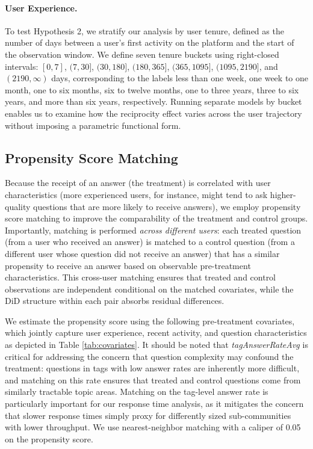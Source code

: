 \paragraph{User Experience.} To test Hypothesis 2, we stratify our analysis by user tenure, defined as the number of days between a user's first activity on the platform and the start of the observation window. We define seven tenure buckets using right-closed intervals: $[0, 7]$, $(7, 30]$, $(30, 180]$, $(180, 365]$, $(365, 1095]$, $(1095, 2190]$, and $(2190, \infty)$ days, corresponding to the labels less than one week, one week to one month, one to six months, six to twelve months, one to three years, three to six years, and more than six years, respectively. Running separate models by bucket enables us to examine how the reciprocity effect varies across the user trajectory without imposing a parametric functional form. 

\subsection{Propensity Score Matching}
\label{sec:matching}

Because the receipt of an answer (the treatment) is correlated with user characteristics (more experienced users, for instance, might tend to ask higher-quality questions that are more likely to receive answers), we employ propensity score matching \citep{rosenbaum_rubin_1983} to improve the comparability of the treatment and control groups. Importantly, matching is performed \textit{across different users}: each treated question (from a user who received an answer) is matched to a control question (from a different user whose question did not receive an answer) that has a similar propensity to receive an answer based on observable pre-treatment characteristics. This cross-user matching ensures that treated and control observations are independent conditional on the matched covariates, while the DiD structure within each pair absorbs residual differences.

We estimate the propensity score using the following pre-treatment covariates, which jointly capture user experience, recent activity, and question characteristics as depicted in Table \ref{tab:covariates}. It should be noted that \textit{tagAnswerRateAvg} is critical for addressing the concern that question complexity may confound the treatment: questions in tags with low answer rates are inherently more difficult, and matching on this rate ensures that treated and control questions come from similarly tractable topic areas.
Matching on the tag-level answer rate is particularly important for our response time analysis, as it mitigates the concern that slower response times simply proxy for differently sized sub-communities with lower throughput. We use nearest-neighbor matching with a caliper of 0.05 on the propensity score.


